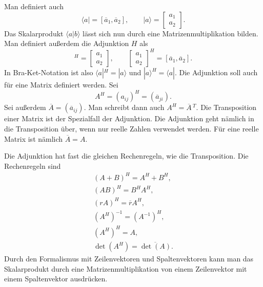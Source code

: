 \documentclass[a4paper,10pt,fleqn,twocolumn,twoside]{article}
\numberwithin{equation}{section}
\begin{document}
Man definiert auch
\begin{equation}
\langle a| = [\overline a_1,\overline a_2],\qquad
|a\rangle = \begin{bmatrix}a_1\\ a_2\end{bmatrix}.
\end{equation}
Das Skalarprodukt $\langle a|b\rangle$ lässt sich nun durch eine
Matrizenmultiplikation bilden. Man definiert außerdem die
Adjunktion $H$ als
\begin{equation}
[\overline a_1,\overline a_2]^H
= \begin{bmatrix}a_1\\ a_2\end{bmatrix},\qquad
\begin{bmatrix}a_1\\ a_2\end{bmatrix}^H
= [\overline a_1,\overline a_2].
\end{equation}
In Bra-Ket-Notation ist also $\langle a|^H=|a\rangle$ und
$|a\rangle^H=\langle a|$. Die Adjunktion soll auch für eine Matrix
definiert werden. Sei
\begin{equation}
A^H = (a_{ij})^H = (\overline a_{ji}).
\end{equation}
Sei außerdem $\overline A=(\overline a_{ij})$. Man schreibt dann
auch $A^H = \overline A\,{}^T$. Die Transposition einer Matrix ist
der Spezialfall der Adjunktion. Die Adjunktion geht nämlich in die
Transposition über, wenn nur reelle Zahlen verwendet werden. Für eine
reelle Matrix ist nämlich $\overline A=A$.

Die Adjunktion hat fast die gleichen Rechenregeln, wie die
Transposition. Die Rechenregeln sind
\begin{gather}
(A+B)^H = A^H+B^H,\\
(AB)^H = B^H A^H,\\
(rA)^H = \overline r A^H,\\
(A^H)^{-1} = (A^{-1})^H,\\
(A^H)^H = A,\\
\det(A^H) = \overline{\det(A)}.
\end{gather}
Durch den Formalismus mit Zeilenvektoren und Spaltenvektoren kann man
das Skalarprodukt durch eine Matrizenmultiplikation von einem
Zeilenvektor mit einem Spaltenvektor ausdrücken.
\end{document}
